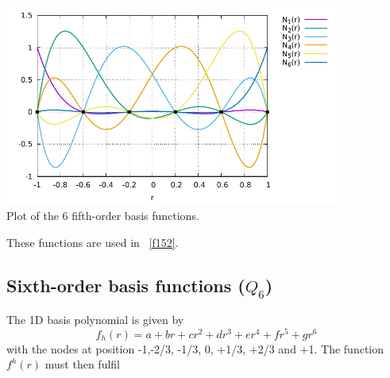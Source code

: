 \begin{center}
\includegraphics[width=11cm]{images/basis1D/Q5.pdf}\\
{\captionfont Plot of the 6 fifth-order basis functions.}
\end{center}


These functions are used in \stone~\ref{f152}.

\subsection{Sixth-order basis functions ($Q_6$) \label{sec:bf6}}

The 1D basis polynomial is given by
\[
f_h(r)=a+br+cr^2+dr^3+er^4+fr^5+gr^6
\]
with the nodes at position -1,-2/3, -1/3, 0, +1/3, +2/3 and +1.
The function $f^h(r)$ must then fulfil 


